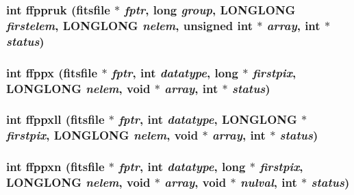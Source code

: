 \subsubsection{\setlength{\rightskip}{0pt plus 5cm}int ffppruk (\bf{fitsfile} $\ast$ {\em fptr}, long {\em group}, \bf{LONGLONG} {\em firstelem}, \bf{LONGLONG} {\em nelem}, unsigned int $\ast$ {\em array}, int $\ast$ {\em status})}\label{test_2shm__client_2fitsio_8h_380316a0418b53a2e545f283279a3eff}


\subsubsection{\setlength{\rightskip}{0pt plus 5cm}int ffppx (\bf{fitsfile} $\ast$ {\em fptr}, int {\em datatype}, long $\ast$ {\em firstpix}, \bf{LONGLONG} {\em nelem}, void $\ast$ {\em array}, int $\ast$ {\em status})}\label{test_2shm__client_2fitsio_8h_9a545226811c5df0f85e0bd4c98f0f95}


\subsubsection{\setlength{\rightskip}{0pt plus 5cm}int ffppxll (\bf{fitsfile} $\ast$ {\em fptr}, int {\em datatype}, \bf{LONGLONG} $\ast$ {\em firstpix}, \bf{LONGLONG} {\em nelem}, void $\ast$ {\em array}, int $\ast$ {\em status})}\label{test_2shm__client_2fitsio_8h_a5a52d455af81ac3c3ea32e15ce790fe}


\subsubsection{\setlength{\rightskip}{0pt plus 5cm}int ffppxn (\bf{fitsfile} $\ast$ {\em fptr}, int {\em datatype}, long $\ast$ {\em firstpix}, \bf{LONGLONG} {\em nelem}, void $\ast$ {\em array}, void $\ast$ {\em nulval}, int $\ast$ {\em status})}\label{test_2shm__client_2fitsio_8h_2ff55dfbe37f1ecf48227480629dc956}


